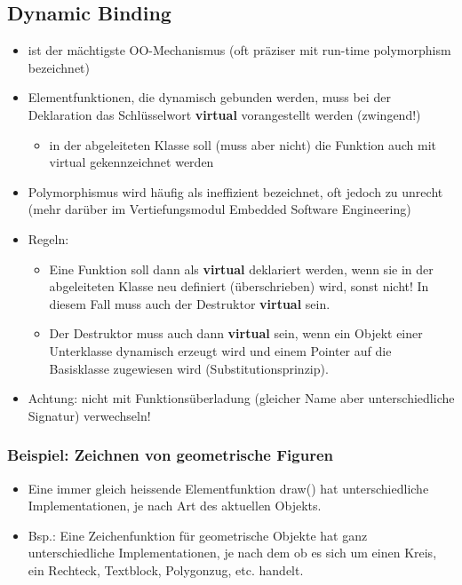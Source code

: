 \subsection{Dynamic Binding}
\begin{itemize}
	\item ist der mächtigste OO-Mechanismus (oft präziser mit run-time polymorphism bezeichnet)
	\item Elementfunktionen, die dynamisch gebunden werden, muss bei der Deklaration das Schlüsselwort \textbf{virtual} vorangestellt werden (zwingend!)
	\begin{itemize}
		\item in der abgeleiteten Klasse soll (muss aber nicht) die Funktion auch mit virtual gekennzeichnet werden
	\end{itemize}
	\item Polymorphismus wird häufig als ineffizient bezeichnet, oft jedoch zu unrecht (mehr darüber im Vertiefungsmodul Embedded Software Engineering)
	\item Regeln:
	\begin{itemize}
		\item Eine Funktion soll dann als \textbf{virtual} deklariert werden, wenn sie in der abgeleiteten Klasse neu definiert (überschrieben) wird, sonst nicht! In diesem Fall muss auch der Destruktor \textbf{virtual} sein.
		\item Der Destruktor muss auch dann \textbf{virtual} sein, wenn ein Objekt einer Unterklasse dynamisch erzeugt wird und einem Pointer auf die Basisklasse zugewiesen wird (Substitutionsprinzip).
	\end{itemize}
	\item Achtung: nicht mit Funktionsüberladung (gleicher Name aber unterschiedliche Signatur) verwechseln!
\end{itemize}

\subsubsection{Beispiel: Zeichnen von geometrische Figuren}
\begin{itemize}
	\item Eine immer gleich heissende Elementfunktion draw() hat unterschiedliche Implementationen, je nach Art des aktuellen Objekts.
	\item Bsp.: Eine Zeichenfunktion für geometrische Objekte hat ganz unterschiedliche Implementationen, je nach dem ob es sich um einen Kreis, ein Rechteck, Textblock, Polygonzug, etc. handelt.
\end{itemize}

